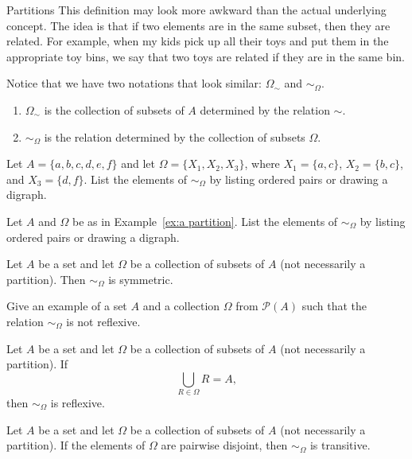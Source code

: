 \begin{section}{Partitions}
This definition may look more awkward than the actual underlying concept.  The idea is that if two elements are in the same subset, then they are related.  For example, when my kids pick up all their toys and put them in the appropriate toy bins, we say that two toys are related if they are in the same bin.

Notice that we have two notations that look similar: $\Omega_{\sim}$ and $\sim_{\Omega}$.  
\begin{enumerate}[label=\textrm{(\alph*)}]
\item $\Omega_{\sim}$ is the collection of subsets of $A$ determined by the relation $\sim$.
\item $\sim_{\Omega}$ is the relation determined by the collection of subsets $\Omega$.
\end{enumerate}

\begin{exercise}
Let $A=\{a,b,c,d,e,f\}$ and let $\Omega=\{X_{1},X_{2},X_{3}\}$, where $X_{1}=\{a,c\}$, $X_{2}=\{b,c\}$, and $X_{3}=\{d,f\}$.  List the elements of $\sim_{\Omega}$ by listing ordered pairs or drawing a digraph.
\end{exercise}

\begin{exercise}
Let $A$ and $\Omega$ be as in Example~\ref{ex:a partition}.  List the elements of $\sim_{\Omega}$ by listing ordered pairs or drawing a digraph.
\end{exercise}

\begin{theorem}
Let $A$ be a set and let $\Omega$ be a collection of subsets of $A$ (not necessarily a partition).  Then $\sim_{\Omega}$ is symmetric.
\end{theorem}

\begin{exercise}
Give an example of a set $A$ and a collection $\Omega$ from $\mathcal{P}(A)$ such that the relation $\sim_{\Omega}$ is not reflexive.
\end{exercise}

\begin{theorem}
Let $A$ be a set and let $\Omega$ be a collection of subsets of $A$ (not necessarily a partition).  If
\[
\bigcup_{R\in\Omega}R=A,
\]
then $\sim_{\Omega}$ is reflexive.
\end{theorem}

\begin{theorem}
Let $A$ be a set and let $\Omega$ be a collection of subsets of $A$ (not necessarily a partition).  If the elements of $\Omega$ are pairwise disjoint, then $\sim_{\Omega}$ is transitive.
\end{theorem}


\end{section}
